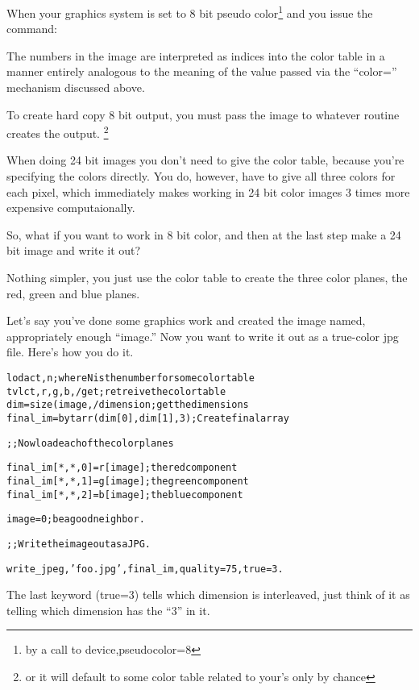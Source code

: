 \begin{itemize}
\begin{itemize}
   When your graphics system is set to 8 bit pseudo color\footnote{by
  a call to device,pseudocolor=8} and you issue the command:


   The numbers in the image are interpreted as indices into the color
   table in a manner entirely analogous to the meaning of the value
   passed via the ``color='' mechanism discussed above.

    
   To create hard copy 8 bit output, you must pass the image  to whatever routine creates the
  output. \footnote{or it will default to some color table related to
  your's only by chance}

  When doing 24 bit images you don't need to give the color table,
  because you're specifying the colors directly. You do, however, have
  to give all three colors for each pixel, which immediately makes
  working in 24 bit color images 3 times more expensive
  computaionally.

  So, what if you want to work in 8 bit color, and then at the last
  step make a 24 bit image and write it out?

  Nothing simpler, you just use the color table to create the three
  color planes, the red, green and blue planes. 

  Let's say you've done some graphics work and created the image
  named, appropriately enough ``image.'' Now you want to write it out
  as a true-color jpg file. Here's how you do it.

\begin{alltt}
lodact, n ; where N is the number for some color table
tvlct, r,g,b,/get  ; retreive the color table
dim=size(image,/dimension ; get the dimensions
final_im = bytarr( dim[0], dim[1], 3 ) ;Create final array

;; Now load each of the color planes

final_im[*,*,0] = r[image]; the red component
final_im[*,*,1] = g[image]; the green  component
final_im[*,*,2] = b[image]; the blue component

image=0; be a good neighbor.

;;Write the image out as a JPG.

write_jpeg, 'foo.jpg', final_im, quality=75, true=3.
\end{alltt}

   The last keyword (true=3) tells which dimension is interleaved,
  just think of it as telling which dimension has the ``3'' in it.

   \end{itemize} 






\end{itemize}


